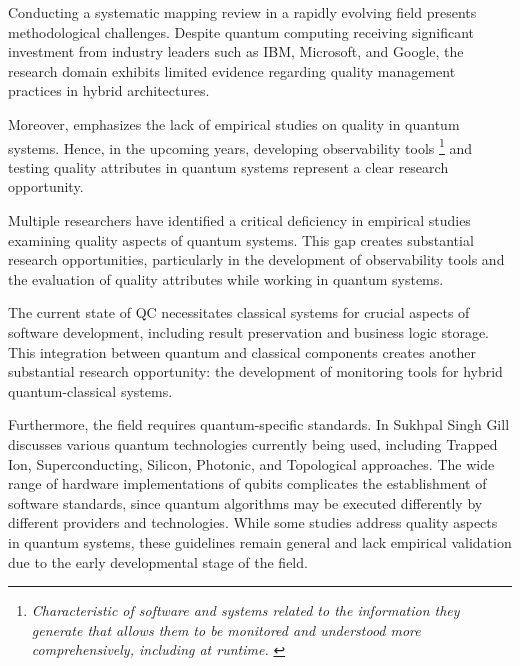 Conducting a systematic mapping review in a rapidly evolving field presents methodological challenges. Despite quantum computing receiving significant investment from industry leaders such as IBM, Microsoft, and Google, the research domain exhibits limited evidence regarding quality management practices in hybrid architectures.

Moreover, \cite{40,26,Zhao_2021} emphasizes the lack of empirical studies on quality in quantum systems. Hence, in the upcoming years, developing observability tools \footnote{\textit{Characteristic of software and systems related to the information they generate that allows them to be monitored and understood more comprehensively, including at runtime.} \cite{Costa_Bachiega_Carvalho_Rosa_Araujo_2022}} and testing quality attributes in quantum systems represent a clear research opportunity.

Multiple researchers \cite{40,26,Zhao_2021} have identified a critical deficiency in empirical studies examining quality aspects of quantum systems. This gap creates substantial research opportunities, particularly in the development of observability tools \cite{Costa_Bachiega_Carvalho_Rosa_Araujo_2022} and the evaluation of quality attributes while working in quantum systems.

The current state of QC necessitates classical systems for crucial aspects of software development, including result preservation and business logic storage. This integration between quantum and classical components creates another substantial research opportunity: the development of monitoring tools for hybrid quantum-classical systems.

Furthermore, the field requires quantum-specific standards. In \cite{Gill2022} Sukhpal Singh Gill discusses various quantum technologies currently being used, including Trapped Ion, Superconducting, Silicon, Photonic, and Topological approaches. The wide range of hardware implementations of qubits complicates the establishment of software standards, since quantum algorithms may be executed differently by different providers and technologies. While some studies \cite{Piattini2020, 26, 40} address quality aspects in quantum systems, these guidelines remain general and lack empirical validation due to the early developmental stage of the field.
